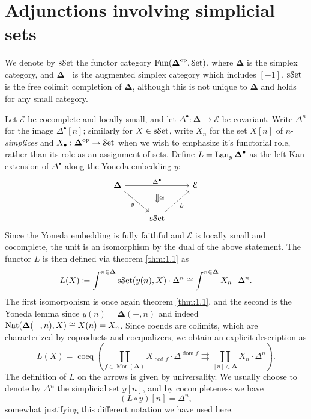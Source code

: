 \section{Adjunctions involving simplicial sets}

We denote by $\mathrm{s}\mathcal{S}\mathrm{et} $ the functor category $\operatorname{Fun}(\boldsymbol{\Delta}^{\mathrm{op}} ,\mathcal{S}\mathrm{et} )$, where $\boldsymbol{\Delta} $ is the simplex category, and $\boldsymbol{\Delta} _+$ is the augmented simplex category which includes $[-1]$. $\mathrm{s}\mathcal{S}\mathrm{et}$ is the free colimit completion of $\boldsymbol{\Delta} $, although this is not unique to $\boldsymbol{\Delta} $ and holds for any small category.

Let $\mathcal{E}$ be cocomplete and locally small, and let $\Delta ^{\bullet} : \boldsymbol{\Delta}  \to \mathcal{E} $ be covariant. Write $\Delta^n$ for the image $\Delta^{\bullet} [n]$; similarly for $X\in\mathrm{s}\mathcal{S}\mathrm{et}$, write $X_n$ for the set $X[n]$ of $n$-\emph{simplices} and $X_{\bullet} : \boldsymbol{\Delta} ^{\mathrm{op}}  \to \mathcal{S}\mathrm{et} $ when we wish to emphasize it's functorial role, rather than its role as an assignment of sets. Define $L=\operatorname{Lan}_y\boldsymbol{\Delta} ^{\bullet} $ as the left Kan extension of $\Delta^{\bullet} $ along the Yoneda embedding $y$:
\[\begin{tikzcd}[row sep = 2.5em, column sep = 2.5em]
	\boldsymbol{\Delta} \ar[" \Delta^{\bullet}  "{name=long}, rr] \ar[" y "', dr]  &  & \mathcal{E}  \\
 & \sSet \ar[" L "', dashed, ur]  & 
 \arrow[from=long, to=2-2, Rightarrow, shorten=10pt, " \cong "] 
\end{tikzcd}\]
Since the Yoneda embedding is fully faithful and $\mathcal{E} $ is locally small and cocomplete, the unit is an isomorphism by the dual of the above statement. The functor $L$ is then defined via theorem \ref{thm:1.1} as
\[
	L(X)\coloneqq \int^{n\in \boldsymbol{\Delta} } \mathrm{s}\mathcal{S}\mathrm{et}(y(n),X)\cdot \Delta^n\cong \int^{n\in\boldsymbol{\Delta} } X_n \cdot \Delta^n
.\]
The first isomorpohism is once again theorem \ref{thm:1.1}, and the second is the Yoneda lemma since $y(n)= \boldsymbol{\Delta}(-,n)$ and indeed $\operatorname{Nat}(\boldsymbol{\Delta} (-,n),X)\cong X(n)=X_n$. Since coends are colimits, which are characterized by coproducts and coequalizers, we obtain an explicit description as
\[
	L(X)=\operatorname{coeq} \left( \coprod_{f\in \operatorname{Mor} (\boldsymbol{\Delta} )} X_{\operatorname{cod}f} \cdot \Delta^{\operatorname{dom} f} \rightrightarrows \coprod_{[n]\in \boldsymbol{\Delta} } X_n \cdot \Delta^n \right) 
.\]
The definition of $L$ on the arrows is given by universality. We usually choose to denote by $\Delta^n$ the simplicial set $y[n]$, and by cocompleteness we have
\[
	(L\circ y)[n]=\Delta^n,
\]
somewhat justifying this different notation we have used here.


